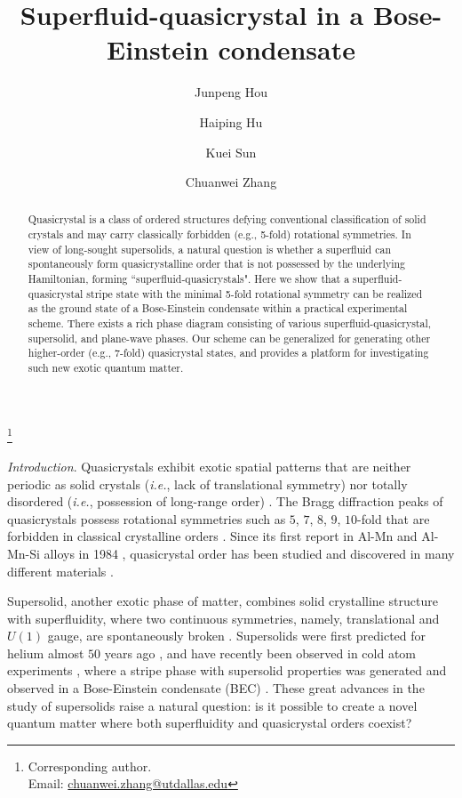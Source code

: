 \documentclass[twocolumn,prl,floatfix,citeautoscript,nofootinbib]{revtex4}
\begin{document}
\author{Junpeng Hou}
\author{Haiping Hu}
\author{Kuei Sun}
\author{Chuanwei Zhang}
\thanks{Corresponding author. \\
Email: \href{mailto:chuanwei.zhang@utdallas.edu}{chuanwei.zhang@utdallas.edu}%
}
\title{Superfluid-quasicrystal in a Bose-Einstein condensate }

\begin{abstract}
Quasicrystal is a class of ordered structures defying conventional
classification of solid crystals and may carry classically forbidden (e.g.,
5-fold) rotational symmetries. In view of long-sought supersolids, a natural
question is whether a superfluid can spontaneously form quasicrystalline
order that is not possessed by the underlying Hamiltonian, forming
``superfluid-quasicrystals". Here we show that a superfluid-quasicrystal
stripe state with the minimal 5-fold rotational symmetry can be realized as
the ground state of a Bose-Einstein condensate within a practical
experimental scheme. There exists a rich phase diagram consisting of various
superfluid-quasicrystal, supersolid, and plane-wave phases. Our scheme can
be generalized for generating other higher-order (e.g., 7-fold) quasicrystal
states, and provides a platform for investigating such new exotic quantum
matter.
\end{abstract}

\maketitle

\emph{Introduction}. Quasicrystals exhibit exotic spatial patterns that are
neither periodic as solid crystals (\textit{i.e.}, lack of translational
symmetry) nor totally disordered (\textit{i.e.}, possession of long-range
order) \cite{Christian1994}. The Bragg diffraction peaks of quasicrystals
possess rotational symmetries such as $5$, $7$, $8$, $9$, $10$-fold that are
forbidden in classical crystalline orders \cite{Christian1994, Levine1984}.
Since its first report in Al-Mn and Al-Mn-Si alloys in 1984 \cite%
{Shechtman1984}, quasicrystal order has been studied and discovered in many
different materials \cite{Macia2006, Freedman2007, Barkan2011, Wasio2014,
Nagao2015, Urgel2016, Bindi2009}.

Supersolid, another exotic phase of matter, combines solid crystalline
structure with superfluidity, where two continuous symmetries, namely,
translational and $U(1)$ gauge, are spontaneously broken \cite%
{Boninsegni2012}. Supersolids were first predicted for helium almost $50$
years ago \cite{Thouless1969, Andreev1971}, and have recently been observed
in cold atom experiments \cite{Li2017, Leonard2017}, where a stripe phase
with supersolid properties was generated and observed in a Bose-Einstein
condensate (BEC) \cite{Li2017}. These great advances in the study of
supersolids raise a natural question: is it possible to create a novel
quantum matter where both superfluidity and quasicrystal orders coexist?
\end{document}
